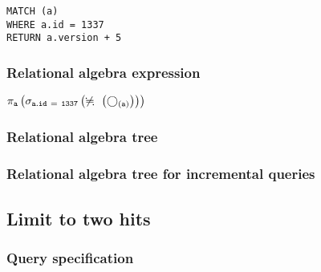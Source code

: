 \begin{lstlisting}
MATCH (a)
WHERE a.id = 1337
RETURN a.version + 5
\end{lstlisting}

\subsubsection*{Relational algebra expression}

$\projection{\var{a}} \left(\selection{\mathtt{a.id~=~1337}} \left(\alldifferent{} \left(\getvertices{a}{}\right)\right)\right)$

\subsubsection*{Relational algebra tree}


\subsubsection*{Relational algebra tree for incremental queries}


\subsection{Limit to two hits}

\subsubsection*{Query specification}

